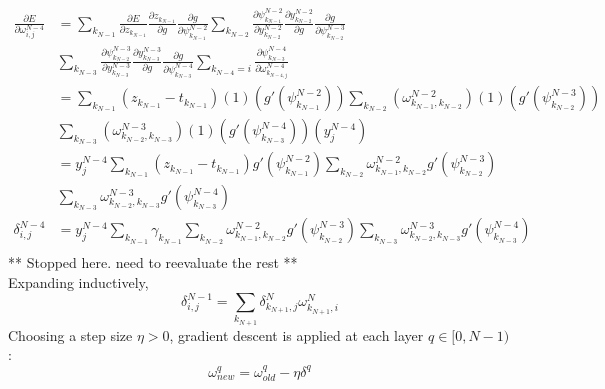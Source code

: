 \documentclass{article}
\begin{document}
\begin{equation} \label{eq:derive_du_nm4}
\begin{aligned}
\frac{\partial E}{\partial \omega_{i,j}^{N-4}} &= 
%
\sum_{k_{N-1}}
\frac{\partial E}{\partial z_{k_{N-1}}}
\frac{\partial z_{k_{N-1}}}{\partial g}
\frac{\partial g}{\partial \psi_{k_{N-1}}^{N-2}}
%
\sum_{k_{N-2}}
\frac{\partial \psi_{k_{N-1}}^{N-2}}{\partial y_{k_{N-2}}^{N-2}}
\frac{\partial y_{k_{N-2}}^{N-2}}{\partial g}
\frac{\partial g}{\partial \psi_{k_{N-2}}^{N-3}} \\
%
&\sum_{k_{N-3}}
\frac{\partial \psi_{k_{N-2}}^{N-3}}{\partial y_{k_{N-3}}^{N-3}}
\frac{\partial y_{k_{N-3}}^{N-3}}{\partial g}
\frac{\partial g}{\partial \psi_{k_{N-3}}^{N-4}}
%
\sum_{k_{N-4}=i}
\frac{\partial \psi_{k_{N-3}}^{N-4}}{\partial \omega_{k_{N-4,j}}^{N-4}} \\
& = \sum_{k_{N-1}}
\left( z_{k_{N-1}} - t_{k_{N-1}} \right)
%
(1)
\left( g' \left( \psi_{k_{N-1}}^{N-2} \right) \right)
%
\sum_{k_{N-2}}
\left( \omega_{k_{N-1},k_{N-2}}^{N-2} \right)
(1)
\left( g' (\psi_{k_{N-2}}^{N-3}) \right) \\
%
&\sum_{k_{N-3}}
\left( \omega_{k_{N-2},k_{N-3}}^{N-3} \right)
(1)
\left( g' (\psi_{k_{N-3}}^{N-4}) \right)
%
\left( y_j^{N-4} \right) \\
& = y_j^{N-4} \sum_{k_{N-1}}
\left(z_{k_{N-1}} - t_{k_{N-1}}\right)
g' \left(\psi_{k_{N-1}}^{N-2}\right)
%
\sum_{k_{N-2}}
\omega_{k_{N-1},k_{N-2}}^{N-2}
g' \left( \psi_{k_{N-2}}^{N-3} \right) \\
%
&\sum_{k_{N-3}}
\omega_{k_{N-2},k_{N-3}}^{N-3}
g' \left( \psi_{k_{N-3}}^{N-4} \right) \\
\delta_{i,j}^{N-4} &= y_j^{N-4} \sum_{k_{N-1}}
\gamma_{k_{N-1}}
%
\sum_{k_{N-2}}
\omega_{k_{N-1},k_{N-2}}^{N-2}
g' \left( \psi_{k_{N-2}}^{N-3} \right)
%
\sum_{k_{N-3}}
\omega_{k_{N-2},k_{N-3}}^{N-3}
g' \left( \psi_{k_{N-3}}^{N-4} \right) \\
\end{aligned}
\end{equation}
%
** Stopped here. need to reevaluate the rest ** \\
Expanding inductively,
%
\begin{equation} \label{eq:delta2}
\delta_{i,j}^{N-1} =
\sum_{k_{N+1}} \delta_{k_{N+1},j}^N \omega_{k_{N+1},i}^N
\end{equation}
%
Choosing a step size $\eta > 0$, gradient descent is applied at each layer $q \in [0, N-1)$:
%
\begin{equation} \label{eq:end_weights}
\omega_{new}^q = \omega_{old}^q - \eta \delta^q
\end{equation}
\end{document}
